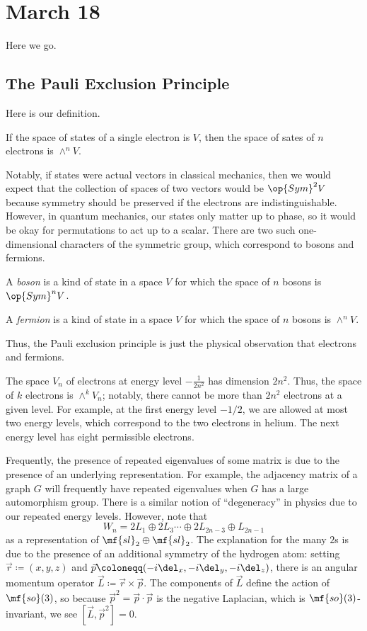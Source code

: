 \documentclass[../notes.tex]{subfiles}
\begin{document}
\section{March 18}
Here we go.

\subsection{The Pauli Exclusion Principle}
Here is our definition.
\begin{definition}
	If the space of states of a single electron is $V$, then the space of sates of $n$ electrons is $\land^nV$.
\end{definition}
Notably, if states were actual vectors in classical mechanics, then we would expect that the collection of spaces of two vectors would be $\op{Sym}^2V$ because symmetry should be preserved if the electrons are indistinguishable. However, in quantum mechanics, our states only matter up to phase, so it would be okay for permutations to act up to a scalar. There are two such one-dimensional characters of the symmetric group, which correspond to bosons and fermions.
\begin{definition}[boson]
	A \textit{boson} is a kind of state in a space $V$ for which the space of $n$ bosons is $\op{Sym}^nV$.
\end{definition}
\begin{definition}[fermion]
	A \textit{fermion} is a kind of state in a space $V$ for which the space of $n$ bosons is $\land^nV$.
\end{definition}
Thus, the Pauli exclusion principle is just the physical observation that electrons and fermions.
\begin{example}
	The space $V_n$ of electrons at energy level $-\frac1{2n^2}$ has dimension $2n^2$. Thus, the space of $k$ electrons is $\land^kV_n$; notably, there cannot be more than $2n^2$ electrons at a given level. For example, at the first energy level $-1/2$, we are allowed at most two energy levels, which correspond to the two electrons in helium. The next energy level has eight permissible electrons.
\end{example}
Frequently, the presence of repeated eigenvalues of some matrix is due to the presence of an underlying representation. For example, the adjacency matrix of a graph $G$ will frequently have repeated eigenvalues when $G$ has a large automorphism group. There is a similar notion of ``degeneracy'' in physics due to our repeated energy levels. However, note that
\[W_n=2L_1\oplus2L_3\cdots\oplus2L_{2n-3}\oplus L_{2n-1}\]
as a representation of $\mf{sl}_2\oplus\mf{sl}_2$. The explanation for the many $2$s is due to the presence of an additional symmetry of the hydrogen atom: setting $\vec r\coloneqq(x,y,z)$ and $\vec p\coloneqq(-i\del_x,-i\del_y,-i\del_z)$, there is an angular momentum operator $\vec L\coloneqq\vec r\times\vec p$. The components of $\vec L$ define the action of $\mf{so}(3)$, so because ${\vec p}^2=\vec p\cdot\vec p$ is the negative Laplacian, which is $\mf{so}(3)$-invariant, we see $[\vec L,{\vec p}^2]=0$.
\end{document}
